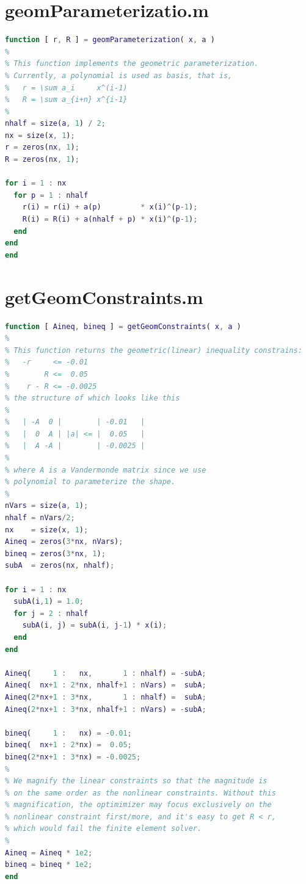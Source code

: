 \documentclass[a4paper]{article}
\begin{document}
\begin{appendices}
\section{geomParameterizatio.m}
\begin{lstlisting}[language=Matlab]
function [ r, R ] = geomParameterization( x, a )
%
% This function implements the geometric parameterization.
% Currently, a polynomial is used as basis, that is,
%   r = \sum a_i     x^(i-1)
%   R = \sum a_{i+n} x^{i-1}
%
nhalf = size(a, 1) / 2;
nx = size(x, 1);
r = zeros(nx, 1);
R = zeros(nx, 1);

for i = 1 : nx
  for p = 1 : nhalf
    r(i) = r(i) + a(p)         * x(i)^(p-1);
    R(i) = R(i) + a(nhalf + p) * x(i)^(p-1);
  end
end
end
\end{lstlisting}

\section{getGeomConstraints.m}\label{app:getgeomcon}
\begin{lstlisting}[language=Matlab]
function [ Aineq, bineq ] = getGeomConstraints( x, a )
%
% This function returns the geometric(linear) inequality constrains:
%   -r     <= -0.01
%        R <=  0.05
%    r - R <= -0.0025
% the structure of which looks like this
%
%   | -A  0 |        | -0.01   |
%   |  0  A | |a| <= |  0.05   |
%   |  A -A |        | -0.0025 |
%
% where A is a Vandermonde matrix since we use
% polynomial to parameterize the shape.
%
nVars = size(a, 1);
nhalf = nVars/2;
nx    = size(x, 1);
Aineq = zeros(3*nx, nVars);
bineq = zeros(3*nx, 1);  
subA  = zeros(nx, nhalf);

for i = 1 : nx
  subA(i,1) = 1.0;
  for j = 2 : nhalf
    subA(i, j) = subA(i, j-1) * x(i);
  end
end

Aineq(     1 :   nx,       1 : nhalf) = -subA;
Aineq(  nx+1 : 2*nx, nhalf+1 : nVars) =  subA;
Aineq(2*nx+1 : 3*nx,       1 : nhalf) =  subA;
Aineq(2*nx+1 : 3*nx, nhalf+1 : nVars) = -subA;

bineq(     1 :   nx) = -0.01;
bineq(  nx+1 : 2*nx) =  0.05;
bineq(2*nx+1 : 3*nx) = -0.0025;
% 
% We magnify the linear constraints so that the magnitude is
% on the same order as the nonlinear constraints. Without this
% magnification, the optimimizer may focus exclusively on the 
% nonlinear constraint first/more, and it's easy to get R < r, 
% which would fail the finite element solver.
%
Aineq = Aineq * 1e2;
bineq = bineq * 1e2;
end
\end{lstlisting}


\end{appendices}
\end{document}
